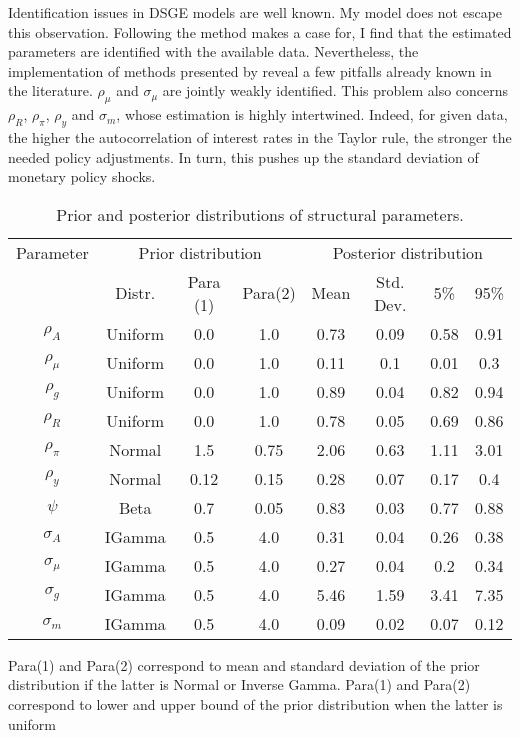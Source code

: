 Identification issues in DSGE models are well known. My model does not escape this observation. Following the method \citet{ISKREV2010189} makes a case for, I find that the estimated parameters are identified with the available data. Nevertheless, the implementation of methods presented by \citet{iskrev2010evaluating} reveal a few pitfalls already known in the literature. $\rho_\mu$ and $\sigma_{\mu}$ are jointly weakly identified. This problem also concerns $\rho_R$, $\rho_{\pi}$, $\rho_y$ and $\sigma_m$, whose estimation is highly intertwined. Indeed, for given data, the higher the autocorrelation of interest rates in the Taylor rule, the stronger the needed policy adjustments. In turn, this pushes up the standard deviation of monetary policy shocks.

\begin{table}[H]
\begin{center}
\caption{Prior and posterior distributions of structural parameters.}
\begin{tabular}{cccccccc}
\toprule
Parameter & \multicolumn{3}{c}{Prior distribution} & \multicolumn{4}{c}{Posterior distribution} \\ \cmidrule{2-4} \cmidrule{5-8} & Distr. & Para (1) & Para(2) & Mean  & Std. Dev. & 5\%   & 95\% \\ \midrule 
$\rho_{A}$ & Uniform & 0.0 & 1.0 & 0.73 & 0.09 & 0.58 & 0.91 \\
$\rho_\mu$ & Uniform & 0.0 & 1.0 & 0.11 & 0.1 & 0.01 & 0.3 \\
$\rho_g$ & Uniform & 0.0 & 1.0 & 0.89 & 0.04 & 0.82 & 0.94 \\
$\rho_R$ & Uniform & 0.0 & 1.0 & 0.78 & 0.05 & 0.69 & 0.86 \\
$\rho_\pi$ & Normal & 1.5 & 0.75 & 2.06 & 0.63 & 1.11 & 3.01 \\
$\rho_y$ & Normal & 0.12 & 0.15 & 0.28 & 0.07 & 0.17 & 0.4 \\
$\psi$ & Beta & 0.7 & 0.05 & 0.83 & 0.03 & 0.77 & 0.88 \\
$\sigma_A$ & IGamma & 0.5 & 4.0 & 0.31 & 0.04 & 0.26 & 0.38 \\
$\sigma_\mu$ & IGamma & 0.5 & 4.0 & 0.27 & 0.04 & 0.2 & 0.34 \\
$\sigma_g$ & IGamma & 0.5 & 4.0 & 5.46 & 1.59 & 3.41 & 7.35 \\
$\sigma_m$ & IGamma & 0.5 & 4.0 & 0.09 & 0.02 & 0.07 & 0.12 \\
\bottomrule
\end{tabular}
\end{center}
\label{estimates}
\begin{flushleft}
\footnotesize{Para(1) and Para(2) correspond to mean and standard deviation of the prior distribution if the latter is Normal or Inverse Gamma. Para(1) and Para(2) correspond to lower and upper bound of the prior distribution when the latter is uniform}
\end{flushleft}
\end{table}

